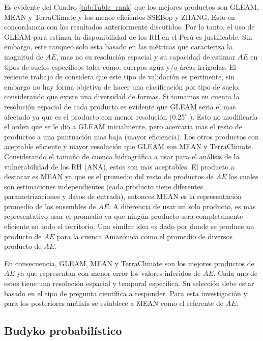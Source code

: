 \documentclass[12pt]{article}
\begin{document}
Es evidente del Cuadro \ref{tab:Table_rank} que los mejores productos son GLEAM, MEAN y TerraClimate y los menos eficientes SSEBop y ZHANG. Esto en concordancia con los resultados anteriormente discutidos. Por lo tanto, el uso de GLEAM para estimar la disponibilidad de los RH en el Perú es justificable. Sin embargo, este ranqueo solo esta basado en las métricas que caracteriza la magnitud de $AE$, mas no su resolución espacial y su capacidad de estimar $AE$ en tipos de suelos específicos tales como: cuerpos agua y/o áreas irrigadas. El reciente trabajo de \citet{Weerasinghe2019discuss} considera que este tipo de validación es pertinente, sin embargo no hay forma objetiva de hacer una clasificación por tipo de suelo, considerando que existe una diversidad de formas. Si tomamos en cuenta la resolución espacial de cada producto es evidente que GLEAM seria el mas afectado ya que es el producto con menor resolución (0.25$^{\circ}$ ). Esto no modificaría el orden que se le dio a GLEAM inicialmente, pero acercaría mas el resto de productos a una puntuación mas baja (mayor eficiencia). Los otros productos con aceptable eficiente y mayor resolución que GLEAM son MEAN y TerraClimate. Considerando el tamaño de cuenca hidrográfica a usar para el análisis de la vulnerabilidad de los RH (ANA), estos son mas aceptables. El producto a destacar es MEAN ya que es el promedio del resto de productos de $AE$ los cuales son estimaciones independientes (cada producto tiene diferentes parametrizaciones y datos de entrada), entonces MEAN es la representación promedio de los ensembles de $AE$. A diferencia de usar un solo producto, es mas representativo usar el promedio ya que ningún producto sera completamente eficiente en todo el territorio. Una similar idea es dado por \citet{da2019spatial} donde se produce un producto de $AE$ para la cuenca Amazónica como el promedio de diversos producto de $AE$.

En consecuencia, GLEAM, MEAN y TerraClimate son los mejores productos de $AE$ ya que representan con menor error los valores inferidos de $AE$. Cada uno de estos tiene una resolución espacial y temporal especifica. Su selección debe estar basado en el tipo de pregunta científica a responder. Para esta investigación y para los posteriores análisis se establece a MEAN como el referente de $AE$.

\subsection{Budyko probabilístico}
\end{document}
